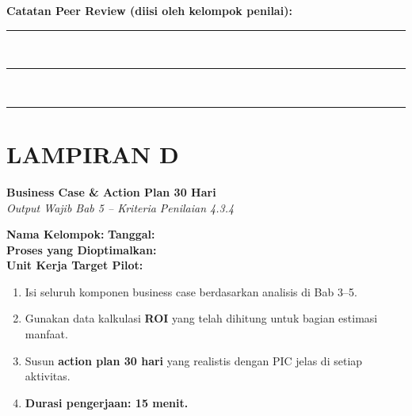 \documentclass[12pt,a4paper]{report}
\newcommand{\fillline}[1][6cm]{\underline{\hspace{#1}}}
\newcommand{\writespace}[1][2cm]{\rule{0pt}{#1}}
\begin{document}
\vspace{0.3cm}

\noindent\textbf{Catatan Peer Review (diisi oleh kelompok penilai):}\\[0.2cm]
\noindent\rule{\textwidth}{0.3pt}\writespace[0.8cm]\\
\noindent\rule{\textwidth}{0.3pt}\writespace[0.8cm]\\
\noindent\rule{\textwidth}{0.3pt}


\newpage
\section*{\color{plnblue} LAMPIRAN D}
{\Large\bfseries Business Case \& Action Plan 30 Hari}\\[0.15cm]
{\normalsize\color{medgray}\textit{Output Wajib Bab 5 -- Kriteria Penilaian 4.3.4}}

\vspace{0.4cm}

\noindent\textbf{Nama Kelompok:} \fillline \quad \textbf{Tanggal:} \fillline[3cm]\\[0.25cm]
\textbf{Proses yang Dioptimalkan:} \fillline[10cm]\\[0.25cm]
\textbf{Unit Kerja Target Pilot:} \fillline[10cm]

\begin{instruksibox}
\begin{enumerate}
    \item Isi seluruh komponen business case berdasarkan analisis di Bab 3--5.
    \item Gunakan data kalkulasi \textbf{ROI} yang telah dihitung untuk bagian estimasi manfaat.
    \item Susun \textbf{action plan 30 hari} yang realistis dengan PIC jelas di setiap aktivitas.
    \item \textbf{Durasi pengerjaan: 15 menit.}
\end{enumerate}
\end{instruksibox}

\vspace{0.3cm}
\end{document}
